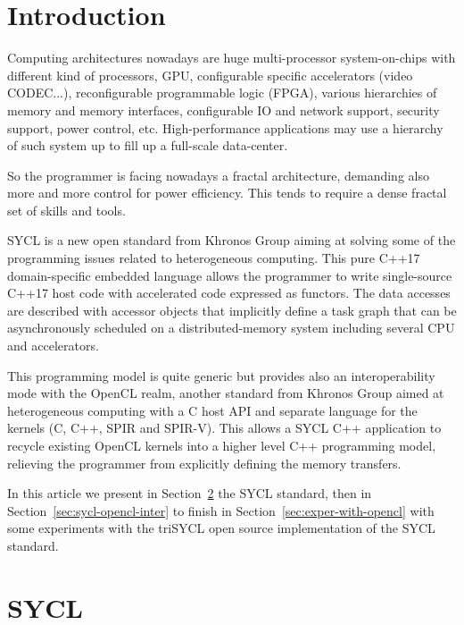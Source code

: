 \documentclass[sigplan, review]{acmart}
\begin{document}


\maketitle

\section{Introduction}
\label{sec:introduction}

Computing architectures nowadays are huge multi-processor
system-on-chips with different kind of processors, GPU, configurable
specific accelerators (video CODEC...), reconfigurable programmable
logic (FPGA), various hierarchies of memory and memory interfaces,
configurable IO and network support, security support, power control,
etc. High-performance applications may use a hierarchy of such system
up to fill up a full-scale data-center.

So the programmer is facing nowadays a fractal architecture, demanding
also more and more control for power efficiency. This tends to require
a dense fractal set of skills and tools.

SYCL \cite{C++:P00236R0:SYCL} is a new open standard from Khronos
Group aiming at solving some of the programming issues related to
heterogeneous computing.  This pure C++17 domain-specific embedded
language allows the programmer to write single-source C++17 host code
with accelerated code expressed as functors. The data accesses are
described with accessor objects that implicitly define a task graph
that can be asynchronously scheduled on a distributed-memory system
including several CPU and accelerators.

This programming model is quite generic but provides also an
interoperability mode with the OpenCL realm, another standard from
Khronos Group aimed at heterogeneous computing with a C host API and
separate language for the kernels (C, C++, SPIR and SPIR-V).  This
allows a SYCL C++ application to recycle existing OpenCL kernels into
a higher level C++ programming model, relieving the programmer from
explicitly defining the memory transfers.

In this article we present in Section~\ref{sec:sycl} the SYCL
standard, then in Section~\ref{sec:sycl-opencl-inter} to finish in
Section~\ref{sec:exper-with-opencl} with some experiments with the
triSYCL open source implementation of the SYCL standard.

\section{SYCL}
\label{sec:sycl}
\end{document}
